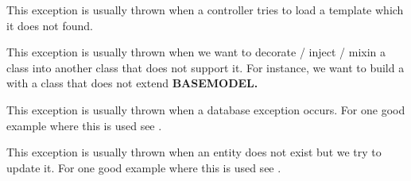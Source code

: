 \documentclass[letterpaper,10pt,english]{sphinxmanual}
\begin{document}

\begin{fulllineitems}
\label{features/exceptions:fantastico.exceptions.FantasticoTemplateNotFoundError}
This exception is usually thrown when a controller tries to load a template which it does not found.

\end{fulllineitems}


\begin{fulllineitems}
\label{features/exceptions:fantastico.exceptions.FantasticoIncompatibleClassError}
This exception is usually thrown when we want to decorate / inject / mixin a class into another class
that does not support it. For instance, we want to build a {\hyperref[features/mvc:fantastico.mvc.model_facade.ModelFacade]{}}
with a class that does not extend \textbf{BASEMODEL.}

\end{fulllineitems}


\begin{fulllineitems}
\label{features/exceptions:fantastico.exceptions.FantasticoDbError}
This exception is usually thrown when a database exception occurs. For one good example where this is used see
{\hyperref[features/mvc:fantastico.mvc.model_facade.ModelFacade]{}}.

\end{fulllineitems}


\begin{fulllineitems}
\label{features/exceptions:fantastico.exceptions.FantasticoDbNotFoundError}
This exception is usually thrown when an entity does not exist but we try to update it. For one good example where this is
used see {\hyperref[features/mvc:fantastico.mvc.model_facade.ModelFacade]{}}.

\end{fulllineitems}
\end{document}
